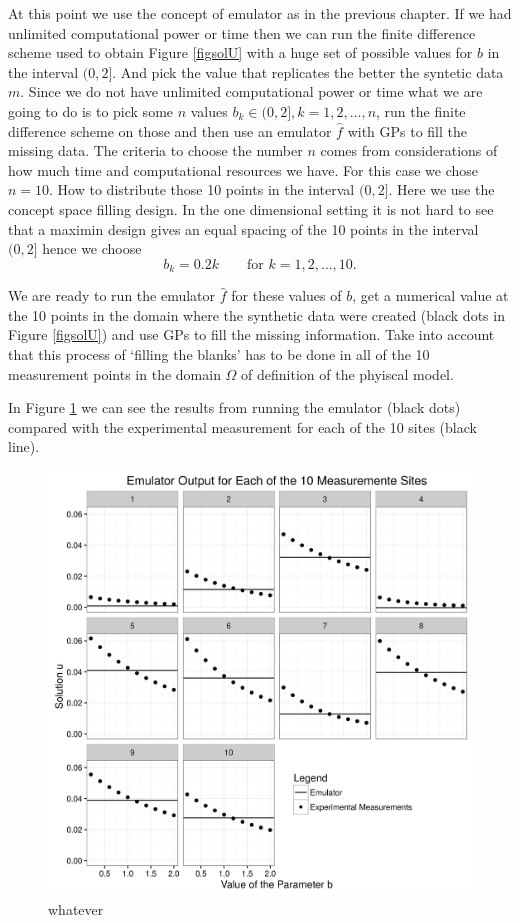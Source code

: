 \documentclass[12pt]{book}
\begin{document}
At this point  we use the concept of emulator as in the previous chapter. If we had unlimited computational
power or time then we can run the finite difference scheme used to obtain Figure \ref{figsolU} with
a huge set of possible values for $b$ in the interval $(0,2]$. And pick the value that replicates the
better the syntetic data $m$. Since we do not have unlimited computational power or time what we
are going to do is to pick some $n$  values $b_{k}\in (0,2], k=1,2,\ldots,n$, run the finite difference
scheme on those and then use an emulator $\hat{f}$ with GPs to fill the missing data. The criteria to 
choose the number $n$ comes from considerations of how much time and computational resources we have.
For this case we chose $n=10$. How to distribute those 10 points in the interval $(0,2]$. Here we
use the concept space filling design. In the one dimensional setting it is not hard to see that
a maximin design gives an equal spacing of the 10 points in the interval $(0,2]$ hence we choose
\begin{equation*}
b_{k}=0.2k \qquad\text{for }k=1,2,\ldots,10.
\end{equation*}

We are ready to run the emulator $\hat{f}$ for these values of $b$, get a numerical value at
the 10 points in the domain where the synthetic data were created (black dots in Figure \ref{figsolU})
and use GPs to fill the missing information. Take into account that this process of `filling the blanks'
has to be done in all of the 10 measurement points in the domain $\Omega$ of definition of the phyiscal model.

In Figure \ref{fignofitted} we can see the results from running the emulator (black dots) compared
with the experimental measurement for each of the 10 sites (black line).

\begin{figure}[H]
\centering
\includegraphics[scale=0.5]{./FigChap3/nofitted}
\caption{whatever}
\label{fignofitted}
\end{figure}





\end{document}
